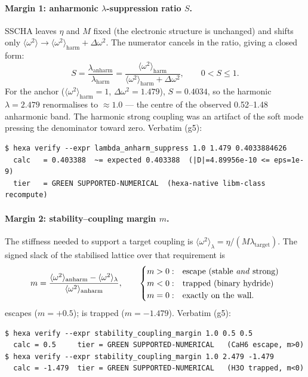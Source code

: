 \paragraph{Margin 1: anharmonic $\lambda$-suppression ratio $S$.}
SSCHA leaves $\eta$ and $M$ fixed (the electronic structure is unchanged)
and shifts only $\langle\omega^2\rangle \to \langle\omega^2\rangle_{\mathrm{harm}}
+ \Delta\omega^2$. The numerator cancels in the ratio, giving a closed form:
\begin{equation}
S = \frac{\lambda_{\mathrm{anharm}}}{\lambda_{\mathrm{harm}}}
  = \frac{\langle\omega^2\rangle_{\mathrm{harm}}}
         {\langle\omega^2\rangle_{\mathrm{harm}} + \Delta\omega^2},
\qquad 0 < S \le 1.
\end{equation}
For the  anchor ($\langle\omega^2\rangle_{\mathrm{harm}} = 1$,
$\Delta\omega^2 = 1.479$), $S = 0.4034$, so the harmonic $\lambda = 2.479$
renormalises to $\approx 1.0$ --- the centre of the observed
0.52--1.48 anharmonic band. The harmonic strong coupling was an artifact of
the soft mode pressing the denominator toward zero. Verbatim (g5):
\begin{lstlisting}[basicstyle=\ttfamily\footnotesize,frame=single,xleftmargin=0pt]
$ hexa verify --expr lambda_anharm_suppress 1.0 1.479 0.4033884626
  calc   = 0.403388  ~= expected 0.403388  (|D|=4.89956e-10 <= eps=1e-9)
  tier   = GREEN SUPPORTED-NUMERICAL  (hexa-native libm-class recompute)
\end{lstlisting}

\paragraph{Margin 2: stability--coupling margin $m$.}
The stiffness needed to support a target coupling is
$\langle\omega^2\rangle_\lambda = \eta/(M\lambda_{\mathrm{target}})$. The
signed slack of the stabilised lattice over that requirement is
\begin{equation}
m = \frac{\langle\omega^2\rangle_{\mathrm{anharm}}
         - \langle\omega^2\rangle_\lambda}
        {\langle\omega^2\rangle_{\mathrm{anharm}}},
\qquad
\begin{cases}
m > 0: & \text{escape (stable \emph{and} strong)}\\
m < 0: & \text{trapped (binary hydride)}\\
m = 0: & \text{exactly on the wall.}
\end{cases}
\end{equation}
 escapes ($m = +0.5$);  is trapped ($m = -1.479$).
Verbatim (g5):
\begin{lstlisting}[basicstyle=\ttfamily\footnotesize,frame=single,xleftmargin=0pt]
$ hexa verify --expr stability_coupling_margin 1.0 0.5 0.5
  calc = 0.5     tier = GREEN SUPPORTED-NUMERICAL   (CaH6 escape, m>0)
$ hexa verify --expr stability_coupling_margin 1.0 2.479 -1.479
  calc = -1.479  tier = GREEN SUPPORTED-NUMERICAL   (H3O trapped, m<0)
\end{lstlisting}

